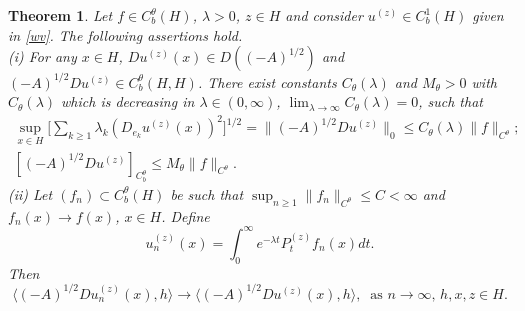 \documentclass[preprint]{imsart}
\newtheorem{theorem}{Theorem}
\begin{document}
   
  
\begin{theorem}\label{ss13} Let $f \in C_b^{\theta}(H)$, $\lambda >0$, $z \in H$ and consider $u^{(z)} \in C^1_b(H)$ given in \eqref{wv}.
 The following assertions hold.  
\\ 
(i) For any $x \in H$,
$Du^{(z)}(x) \in D((-A)^{1/2})$ and $(-A)^{1/2} Du^{(z)} \in C_b^{\theta}(H, H)$.
  There exist constants $C_{\theta}(\lambda)$ and $M_{\theta} >0$ with $C_{\theta}(\lambda)$ which is decreasing  in $\lambda \in (0, \infty)$, $\lim_{\lambda \to \infty} C_{\theta}(\lambda) =0$, such that  
\begin{gather}\label{w44}    
 \sup_{x \in H} \big [\sum_{k \ge 1} \lambda_k  (D_{e_k} u^{(z)} (x))^2  \big]^{1/2}= \| (-A)^{1/2} Du^{(z)}\|_0  \le C_{\theta}(\lambda)\|f\|_{C^{\theta}};
\\ \label{w441}
  [ (-A)^{1/2} Du^{(z)} ]_{C_b^{\theta}}  \le M_{\theta} \|f\|_{C^{\theta}}.
\end{gather} 
(ii) Let $(f_n) \subset C_b^{\theta}(H)$ be such  that $\sup_{n \ge 1 }\| f_n\|_{C^{\theta}} \le C < \infty$ and  $f_n(x) \to f(x)$, $x \in H$. Define
$$
u^{(z)}_n(x) = \int_0^{\infty} e^{- \lambda t}  P_{t}^{(z)}  f_n(x) dt.
$$ 
Then 
 \begin{equation} \label{s1144} 
\langle (-A)^{1/2} Du^{(z)}_n(x), h \rangle  
\to  
\langle (-A)^{1/2} Du^{(z)}(x), h \rangle,    \;\; \text{as $n \to \infty$, $h, x, z  \in H$.}    
\end{equation}
\end{theorem}   
\end{document}
